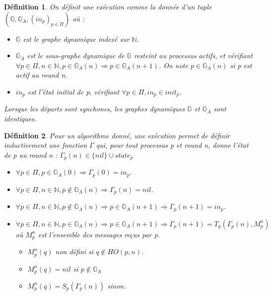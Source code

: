 \documentclass{article}
\newtheorem{definition}{Définition}
\begin{document}
\begin{definition}

On définit une exécution comme la donnée d'un tuple
$( \mathds{G},  \mathds{G}_A, (in_p)_{p \in \Pi})$ où :

\begin{itemize}

	\item $\mathds{G}$ est le graphe dynamique indexé sur $\mathds{N}$.
	\item $\mathds{G}_A$ est le sous-graphe dynamique de $\mathds{G}$ resteint au processus actifs, et vérifiant
		$\forall p \in \Pi,  n \in \mathds{N}, p \in \mathds{G}_A(n) \Rightarrow p \in \mathds{G}_A(n+1)$.
		On note $p \in \mathds{G}_A(n)$ si p est actif au round n.
	\item $in_p$ est l'état initial de p, vérifiant $\forall p \in \Pi, in_p \in init_p$.

\end{itemize}
Lorsque les départs sont synchones, les graphes dynamiques $\mathds{G}$ et $\mathds{G}_A$ sont identiques.
\end{definition}

\begin{definition}
	Pour un algorithme donné, une exécution permet de définir inductivement une fonction $\Gamma$ qui,
	pour tout processus p et round n, donne l'état de p au round n : $\Gamma_p(n) \in \{nil\} \cup state_p$
	\begin{itemize}
		\item $\forall p \in \Pi, p \in \mathds{G}_A(0) \Rightarrow \Gamma_p(0) = in_p$.
		\item $\forall p \in \Pi, n \in \mathds{N}, p \notin \mathds{G}_A(n) \Rightarrow \Gamma_p(n) = nil$.
		\item $\forall p \in \Pi, n \in \mathds{N}, p \notin \mathds{G}_A(n) \Rightarrow p \in \mathds{G}_A(n+1) \Rightarrow \Gamma_p(n+1) = in_p$.
		\item $\forall p \in \Pi, n \in \mathds{N}, p \in    \mathds{G}_A(n) \Rightarrow p \in \mathds{G}_A(n+1) \Rightarrow \Gamma_p(n+1) = T_p (\Gamma_p(n) ,M_p^n)$
			où $M_p^n$ est l'ensemble des messages reçus par p.
		\begin{itemize}
			\item $M_p^n(q)$ non défini si $q \notin HO(p, n)$.
			\item $M_p^n(q) = nil$ si $p \notin \mathds{G}_A$
			\item $M_p^n(q) = S_p (\Gamma_p(n))$ sinon.
		\end{itemize}

	\end{itemize}
\end{definition}
\end{document}
